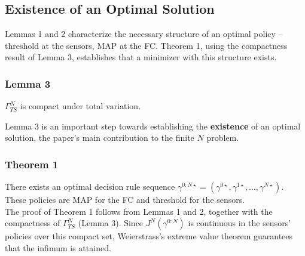 \documentclass[11pt]{article}
\begin{document}
\subsection{Existence of an Optimal Solution}
Lemmas 1 and 2 characterize the necessary structure of an optimal policy -- threshold at the sensors, MAP at the FC. Theorem 1, using the compactness result of Lemma 3, establishes that a minimizer with this structure exists.
\subsubsection*{Lemma 3}
\begin{center}
    $\Gamma^N_{TS}$ is compact under total variation.
\end{center}
Lemma 3 is an important step towards establishing the \textbf{existence} of an optimal solution, the paper's main contribution to the finite $N$ problem.

\subsubsection*{Theorem 1}
There exists an optimal decision rule sequence $\gamma^{0:N\star} = (\gamma^{0\star},\gamma^{1\star},\dots, \gamma^{N\star})$. These policies are MAP for the FC and threshold for the sensors.\\
The proof of Theorem 1 follows from Lemmas 1 and 2, together with the compactness of $\Gamma^N_{TS}$ (Lemma 3). Since $J^N(\gamma^{0:N})$ is continuous in the sensors' policies over this compact set, Weierstrass's extreme value theorem guarantees that the infimum is attained.
\end{document}
